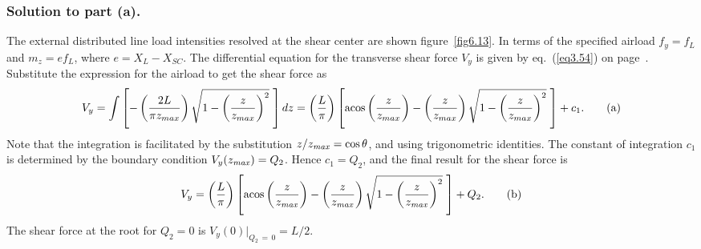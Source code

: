 \documentclass{AeroStructure-ERJohnson}
\begin{document}
\begin{example*}
\vspace*{-10pt}

\subsubsection{Solution to part (a).} The external distributed line load intensities resolved at the shear center are shown figure~\ref{fig6.13}. In terms of the specified airload $f_{y}=f_{L}$ and $m_{z}=ef_{L}$, where $e=X_{L}-X_{S C}$. The differential equation for the transverse shear force $V_y$ is given by eq.~(\ref{eq3.54}) on page~\pageref{eq3.54}. Substitute the expression for the airload to get the shear force as
\begin{equation*}
V_{y}=\int\left[-\left(\frac{2 L}{\pi z_{m a x}}\right) \sqrt{1-\left(\frac{z}{z_{m a x}}\right)^{2}}\hspace*{3pt}\right] d z=\left(\frac{L}{\pi}\right)\left[\operatorname{acos}\left(\frac{z}{z_{m a x}}\right)-\left(\frac{z}{z_{m a x}}\right) \sqrt{1-\left(\frac{z}{z_{m a x}}\right)^{2}}\hspace*{3pt}\right]+c_{1}.\tag{a}
\end{equation*}
Note that the integration is facilitated by the substitution $z / z_{\it max }=\cos \theta$, and using trigonometric identities. The constant of integration $c_1$ is determined by the boundary condition $V_{y}(z_{\it max})=Q_{2}$. Hence $c_{1}=Q_{2}$, and the final result for the shear force is
\begin{equation*}
V_{y}=\left(\frac{L}{\pi}\right)\left[\text{acos}\left(\frac{z}{z_{\it max }}\right)-\left(\frac{z}{z_{\it max }}\right) \sqrt{1-\left(\frac{z}{z_{\it max }}\right)^{2}}\hspace*{3pt}\right]+Q_{2}.\tag{b}
\end{equation*}
The shear force at the root for $Q_2 = 0$ is $V_{y}(0)|_{Q_{2}\,=\,0}=L / 2$.


\end{example*}
\end{document}

